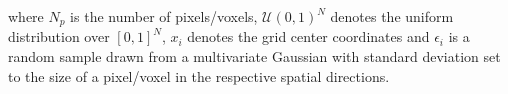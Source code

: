 where $N_p$ is the number of pixels/voxels, $\mathcal{U}(0,1)^N$ denotes the uniform distribution over $[0,1]^N$, $x_i$ denotes the grid center coordinates and $\epsilon_i$ is a random sample drawn from a multivariate Gaussian with standard deviation set to the size of a pixel/voxel in the respective spatial directions. 








